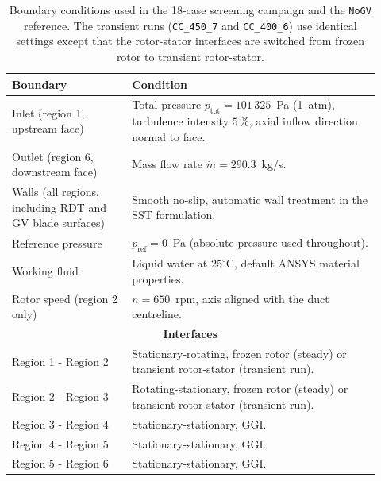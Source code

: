 \begin{table}[h!]
  \centering
  \caption[Boundary conditions for the screening simulations]{Boundary conditions used in the 18-case screening campaign and the \texttt{NoGV} reference. The transient runs (\texttt{CC\_450\_7} and \texttt{CC\_400\_6}) use identical settings except that the rotor-stator interfaces are switched from frozen rotor to transient rotor-stator.}
  \label{tab:bc_master}
  \small
  \begin{tabular}{p{0.30\linewidth} p{0.62\linewidth}}
    \toprule
    \textbf{Boundary} & \textbf{Condition} \\
    \midrule
    Inlet (region 1, upstream face)
        & Total pressure $p_{\mathrm{tot}} = 101\,325$~Pa (1~atm),
          turbulence intensity $5\,\%$, axial inflow direction normal to face. \\
    Outlet (region 6, downstream face)
        & Mass flow rate $\dot m = 290.3$~kg/s. \\
    Walls (all regions, including RDT and GV blade surfaces)
        & Smooth no-slip, automatic wall treatment in the SST formulation. \\
    Reference pressure
        & $p_{\mathrm{ref}} = 0$~Pa (absolute pressure used throughout). \\
    Working fluid
        & Liquid water at $25^\circ$C, default ANSYS material properties. \\
    Rotor speed (region 2 only)
        & $n = 650$~rpm, axis aligned with the duct centreline. \\
    \midrule
    \multicolumn{2}{c}{\textbf{Interfaces}} \\
    \midrule
    Region 1 - Region 2
        & Stationary-rotating, frozen rotor (steady) or transient rotor-stator (transient run). \\
    Region 2 - Region 3
        & Rotating-stationary, frozen rotor (steady) or transient rotor-stator (transient run). \\
    Region 3 - Region 4
        & Stationary-stationary, GGI. \\
    Region 4 - Region 5
        & Stationary-stationary, GGI. \\
    Region 5 - Region 6
        & Stationary-stationary, GGI. \\
    \bottomrule
  \end{tabular}
\end{table}
 
